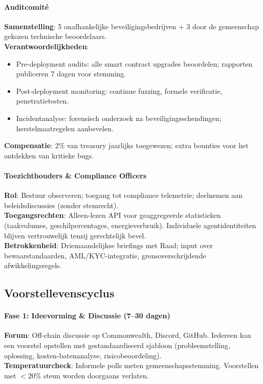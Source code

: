 \documentclass[11pt]{article}
\begin{document}
\paragraph{Auditcomité}
\textbf{Samenstelling}: 5 onafhankelijke beveiligingsbedrijven + 3 door de gemeenschap gekozen technische beoordelaars.\\
\textbf{Verantwoordelijkheden}:
\begin{itemize}[noitemsep]
  \item Pre-deployment audits: alle smart contract upgrades beoordelen; rapporten publiceren 7 dagen voor stemming.
  \item Post-deployment monitoring: continue fuzzing, formele verificatie, penetratietesten.
  \item Incidentanalyse: forensisch onderzoek na beveiligingsschendingen; herstelmaatregelen aanbevelen.
\end{itemize}
\textbf{Compensatie}: 2\% van treasury jaarlijks toegewezen; extra bounties voor het ontdekken van kritieke bugs.

\paragraph{Toezichthouders \& Compliance Officers}
\textbf{Rol}: Bestuur observeren; toegang tot compliance telemetrie; deelnemen aan beleidsdiscussies (zonder stemrecht).\\
\textbf{Toegangsrechten}: Alleen-lezen API voor geaggregeerde statistieken (taakvolumes, geschilpercentages, energieverbruik). Individuele agentidentiteiten blijven vertrouwelijk tenzij gerechtelijk bevel.\\
\textbf{Betrokkenheid}: Driemaandelijkse briefings met Raad; input over bewaarstandaarden, AML/KYC-integratie, grensoverschrijdende afwikkelingsregels.

\subsection{Voorstellevenscyclus}

\paragraph{Fase 1: Ideevorming \& Discussie (7--30 dagen)}
\textbf{Forum}: Off-chain discussie op Commonwealth, Discord, GitHub. Iedereen kan een voorstel opstellen met gestandaardiseerd sjabloon (probleemstelling, oplossing, kosten-batenanalyse, risicobeoordeling).\\
\textbf{Temperatuurcheck}: Informele polls meten gemeenschapsstemming. Voorstellen met $<20\%$ steun worden doorgaans verlaten.
\end{document}
